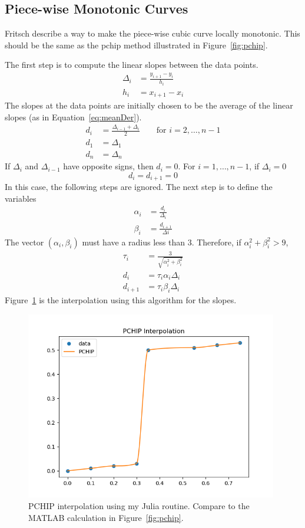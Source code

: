 \documentclass{scrartcl}
\begin{document}
\subsection{Piece-wise Monotonic Curves}
Fritsch\cite{Fritsch,Wiki} describe a way to make the piece-wise
cubic curve locally monotonic. This should be the same as the pchip
method illustrated in Figure~\ref{fig:pchip}.

The first step is to compute the linear slopes between the data
points.
\begin{align}
\Delta_i &= \frac{y_{i+1}-y_i}{h_i}\\
h_i &= x_{i+1}-x_i
\end{align}
The slopes at the data points are initially chosen to be the average
of the linear slopes (as in Equation~\ref{eq:meanDer}).
\begin{align}
d_i &= \frac{\Delta_{i-1}+\Delta_i}{2}\qquad\mbox{for } i=2,\ldots,n-1\\
d_1 &= \Delta_1\\
d_n &= \Delta_n
\end{align}
If $\Delta_i$ and $\Delta_{i-1}$ have opposite signs, then $d_i=0$.
For $i=1,\ldots,n-1$, if $\Delta_i=0$
\begin{equation}
d_i = d_{i+1}=0
\end{equation}
In this case, the following steps are ignored.
The next step is to define the variables
\begin{align}
\alpha_i &= \frac{d_i}{\Delta_i}\\
\beta_i &= \frac{d_{i+1}}{\Delta i}
\end{align}
The vector $(\alpha_i,\beta_i)$ must have a radius less than 3.
Therefore, if $\alpha_i^2+\beta_i^2>9$,
\begin{align}
\tau_i &= \frac{3}{\sqrt{\alpha_i^2+\beta_i^2}}\\
d_i &= \tau_i \alpha_i \Delta_i\\
d_{i+1} &= \tau_i \beta_i \Delta_i
\end{align}
Figure~\ref{fig:pchipBump} is the interpolation using this algorithm
for the slopes.
\begin{figure}
\begin{center}
\includegraphics[width=11cm]{pchipBump}
\end{center}
\caption{\label{fig:pchipBump}PCHIP interpolation using my
Julia routine. Compare to the MATLAB calculation in
Figure~\ref{fig:pchip}.}
\end{figure}
\appendix
\end{document}
